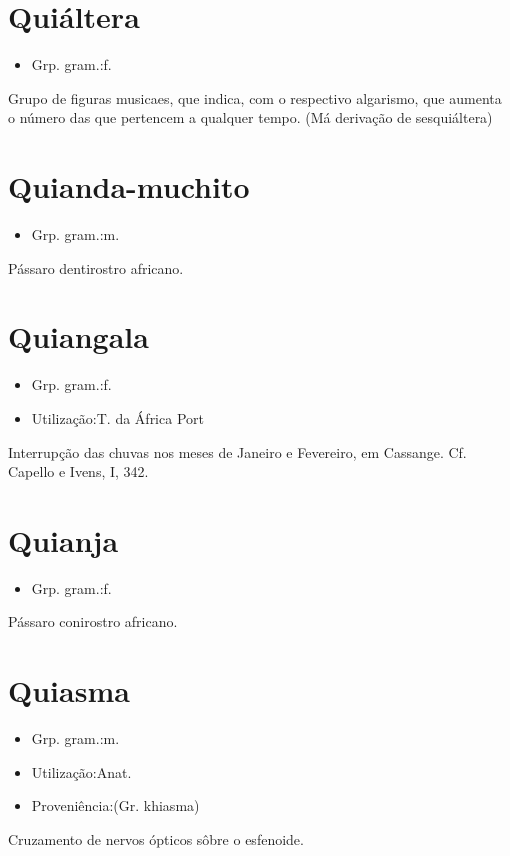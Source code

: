 \section{Quiáltera}
\begin{itemize}
\item {Grp. gram.:f.}
\end{itemize}
Grupo de figuras musicaes, que indica, com o respectivo algarismo, que aumenta o número das que pertencem a qualquer tempo.
(Má derivação de \textunderscore sesquiáltera\textunderscore )
\section{Quianda-muchito}
\begin{itemize}
\item {Grp. gram.:m.}
\end{itemize}
Pássaro dentirostro africano.
\section{Quiangala}
\begin{itemize}
\item {Grp. gram.:f.}
\end{itemize}
\begin{itemize}
\item {Utilização:T. da África Port}
\end{itemize}
Interrupção das chuvas nos meses de Janeiro e Fevereiro, em Cassange. Cf. Capello e Ivens, I, 342.
\section{Quianja}
\begin{itemize}
\item {Grp. gram.:f.}
\end{itemize}
Pássaro conirostro africano.
\section{Quiasma}
\begin{itemize}
\item {Grp. gram.:m.}
\end{itemize}
\begin{itemize}
\item {Utilização:Anat.}
\end{itemize}
\begin{itemize}
\item {Proveniência:(Gr. \textunderscore khiasma\textunderscore )}
\end{itemize}
Cruzamento de nervos ópticos sôbre o esfenoide.
